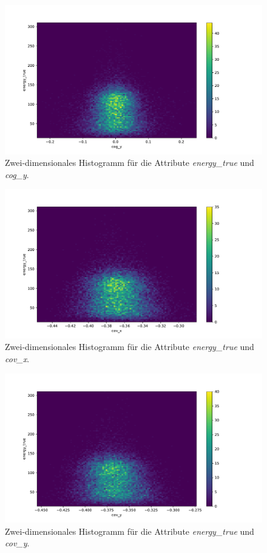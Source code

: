 \documentclass[a4paper, 11pt]{article}
\begin{document}
\begin{figure}[H]
    \centering
    \includegraphics[width=\textwidth]{../A38/A37a_cog_y.pdf}
    \caption{Zwei-dimensionales Histogramm für die Attribute \textit{energy\_true} und \textit{cog\_y}.}
    \label{fig:hist_cog_y}
\end{figure}
\begin{figure}[H]
    \centering
    \includegraphics[width=\textwidth]{../A38/A37a_cov_x.pdf}
    \caption{Zwei-dimensionales Histogramm für die Attribute \textit{energy\_true} und \textit{cov\_x}.}
    \label{fig:hist_cov_x}
\end{figure}
\begin{figure}[H]
    \centering
    \includegraphics[width=\textwidth]{../A38/A37a_cov_y.pdf}
    \caption{Zwei-dimensionales Histogramm für die Attribute \textit{energy\_true} und \textit{cov\_y}.}
    \label{fig:hist_cov_y}
\end{figure}
\end{document}

